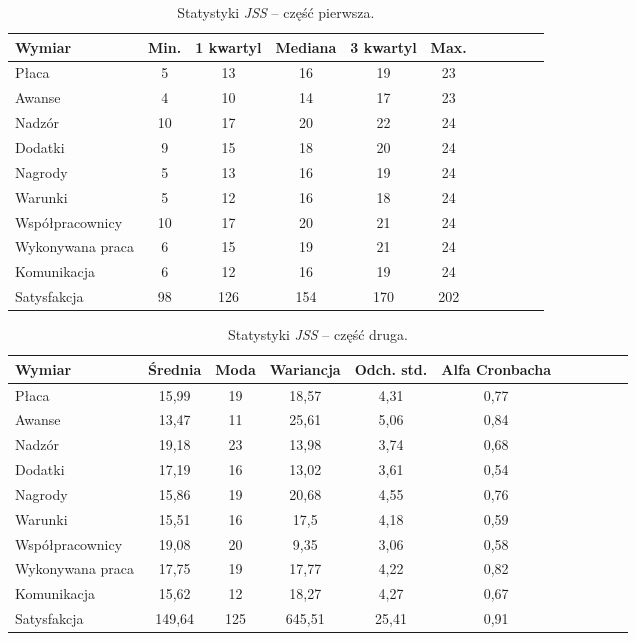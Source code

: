 \begin{table}[h!]
\begin{center}
\begin{tabular}{l | c c c c c c c c c c}
Wymiar & Min. & 1 kwartyl & Mediana & 3 kwartyl & Max.\\ \hline \hline
Płaca & 5 & 13 & 16 & 19 & 23 \\ 
Awanse & 4 & 10 & 14 & 17 & 23 \\
Nadzór & 10 & 17 & 20 & 22 & 24 \\
Dodatki & 9 & 15 & 18 & 20 & 24 \\
Nagrody & 5 & 13 & 16 & 19 & 24 \\
Warunki & 5 & 12 & 16 & 18 & 24 \\
Współpracownicy & 10 & 17 & 20 & 21 & 24 \\
Wykonywana praca & 6 & 15 & 19 & 21 & 24 \\
Komunikacja & 6 & 12 & 16 & 19 & 24 \\ \hline
Satysfakcja & 98 & 126 & 154 & 170 & 202 \\ \hline
\end{tabular}
\end{center}
\caption{Statystyki \emph{JSS} -- część pierwsza.}
\label{tab:jss-stats-1}
\end{table}

\begin{table}[h!]
\begin{center}
\begin{tabular}{l | c c c c c c c c c c}
Wymiar & Średnia & Moda & Wariancja & Odch. std. & Alfa Cronbacha\\ \hline \hline
Płaca & 15,99 & 19 & 18,57 & 4,31 & 0,77 \\
Awanse & 13,47 & 11 & 25,61 & 5,06 & 0,84 \\
Nadzór & 19,18 & 23 & 13,98 & 3,74 & 0,68 \\
Dodatki & 17,19 & 16 & 13,02 & 3,61 & 0,54 \\
Nagrody & 15,86 & 19 & 20,68 & 4,55 & 0,76 \\
Warunki & 15,51 & 16 & 17,5 & 4,18 & 0,59 \\
Współpracownicy & 19,08 & 20 & 9,35 & 3,06 & 0,58 \\
Wykonywana praca & 17,75 & 19 & 17,77 & 4,22 & 0,82 \\
Komunikacja & 15,62 & 12 & 18,27 & 4,27 & 0,67 \\ \hline
Satysfakcja & 149,64 & 125 & 645,51 & 25,41 & 0,91 \\ \hline
\end{tabular}
\end{center}
\caption{Statystyki \emph{JSS} -- część druga.}
\label{tab:jss-stats-2}
\end{table}

